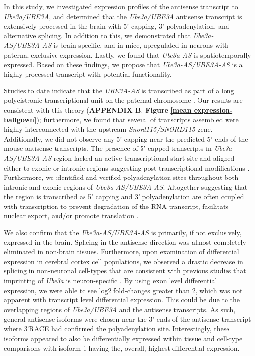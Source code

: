 In this study, we investigated expression profiles of the antisense transcript to \textit{Ube3a/UBE3A}, and determined that the \textit{Ube3a/UBE3A} antisense transcript is extensively processed in the brain with 5' capping, 3' polyadenylation, and alternative splicing. In addition to this, we demonstrated that \textit{Ube3a-AS/UBE3A-AS} is brain-specific, and in mice, upregulated in neurons with paternal exclusive expression. Lastly, we found that \textit{Ube3a-AS} is spatiotemporally expressed. Based on these findings, we propose that \textit{Ube3a-AS/UBE3A-AS} is a highly processed transcript with potential functionality.

Studies to date indicate that the \textit{UBE3A-AS} is transcribed as part of a long polycistronic transcriptional unit on the paternal chromosome \cite{Chamberlain2001,Landers2004,Runte2001}. Our results are consistent with this theory (\textbf{APPENDIX B, Figure \ref{mean expression-ballgown}}); furthermore, we found that several of transcripts assembled were highly interconnected with the upstream \textit{Snord115/SNORD115} gene. Additionally, we did not observe any 5' capping near the predicted 5' ends of the mouse antisense transcripts. The presence of 5' capped transcripts in \textit{Ube3a-AS/UBE3A-AS} region lacked an active transcriptional start site and aligned either to exonic or intronic regions suggesting post-transcriptional modifications \cite{Affymetrix2009,Kiss2015,Mercer2010}. Furthermore, we identified and verified polyadenylation sites throughout both intronic and exonic regions of \textit{Ube3a-AS/UBE3A-AS}. Altogether suggesting that the region is transcribed as 5' capping and 3' polyadenylation are often coupled with transcription to prevent degradation of the RNA transcript, facilitate nuclear export, and/or promote translation \cite{Hocine2010}.

We also confirm that the \textit{Ube3a-AS/UBE3A-AS} is primarily, if not exclusively, expressed in the brain. Splicing in the antisense direction was almost completely eliminated in non-brain tissues. Furthermore, upon examination of differential expression in cerebral cortex cell populations, we observed a drastic decrease in splicing in non-neuronal cell-types that are consistent with previous studies that imprinting of \textit{Ube3a} is neuron-specific \cite{Dindot2008,Yamasaki2003}.
By using exon level differential expression, we were able to see log2 fold-changes greater than 2, which was not apparent with transcript level differential expression. This could be due to the overlapping regions of \textit{Ube3a/UBE3A} and the antisense transcripts. As such, general antisense isoforms were chosen near the 3' ends of the antisense transcript where 3'RACE had confirmed the polyadenylation site. Interestingly, these isoforms appeared to also be differentially expressed within tissue and cell-type comparisons with isoform 1 having the, overall, highest differential expression.


